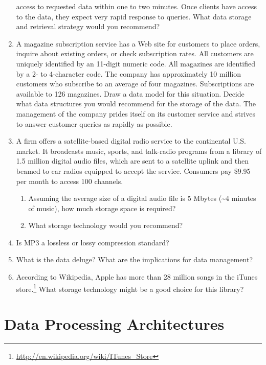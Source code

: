 \documentclass[
]{article}
\begin{document}
\begin{enumerate}
  access to requested data within one to two minutes. Once clients
  have access to the data, they expect very rapid response to queries.
  What data storage and retrieval strategy would you recommend?
\item
  A magazine subscription service has a Web site for customers to
  place orders, inquire about existing orders, or check subscription
  rates. All customers are uniquely identified by an 11-digit numeric
  code. All magazines are identified by a 2- to 4-character code. The
  company has approximately 10 million customers who subscribe to an
  average of four magazines. Subscriptions are available to 126
  magazines. Draw a data model for this situation. Decide what data
  structures you would recommend for the storage of the data. The
  management of the company prides itself on its customer service and
  strives to answer customer queries as rapidly as possible.
\item
  A firm offers a satellite-based digital radio service to the
  continental U.S. market. It broadcasts music, sports, and talk-radio
  programs from a library of 1.5 million digital audio files, which
  are sent to a satellite uplink and then beamed to car radios
  equipped to accept the service. Consumers pay \$9.95 per month to
  access 100 channels.

  \begin{enumerate}
  \def\labelenumii{\alph{enumii}.}
  \item
    Assuming the average size of a digital audio file is 5 Mbytes
    (\textasciitilde4 minutes of music), how much storage space is required?
  \item
    What storage technology would you recommend?
  \end{enumerate}
\item
  Is MP3 a lossless or lossy compression standard?
\item
  What is the data deluge? What are the implications for data
  management?
\item
  According to Wikipedia, Apple has more than 28 million songs in the
  iTunes store.\footnote{\url{http://en.wikipedia.org/wiki/ITunes_Store}} What storage technology might be a good choice for
  this library?
\end{enumerate}

\hypertarget{data-processing-architectures}{%
\section{Data Processing Architectures}\label{data-processing-architectures}}
\end{document}
